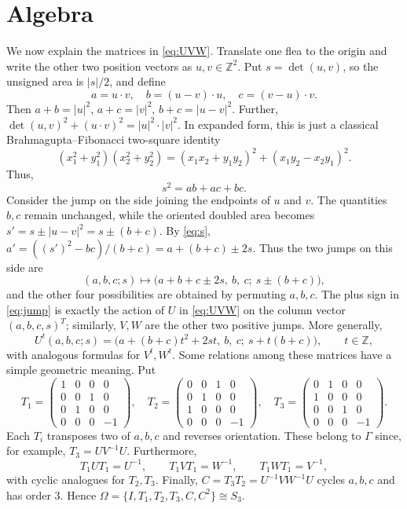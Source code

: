 \documentclass[12pt]{article}
\theoremstyle{definition}
\theoremstyle{remark}
\newcommand{\Z}{\mathbb Z}
\begin{document}
\section{Algebra}
We now explain the matrices in \eqref{eq:UVW}. Translate one flea to the
origin and write the other two position vectors as $u,v\in\Z^2$. Put
$s=\det(u,v)$, so the unsigned area is $|s|/2$, and define
\begin{equation*}
a=u\cdot v,\quad b=(u-v)\cdot u,\quad
c=(v-u)\cdot v.
\end{equation*}
Then $a+b=|u|^2$, $a+c=|v|^2$, $b+c=|u-v|^2$. Further, $\det(u,v)^2+(u\cdot v)^2=|u|^2\cdot |v|^2$. In expanded form, this is just a classical Brahmagupta–Fibonacci two-square identity 
\[
(x_1^2+y_1^2)(x_2^2+y_2^2)=(x_1x_2+y_1y_2)^2+(x_1y_2-x_2y_1)^2.
\]
Thus,
\begin{equation}\label{eq:s}
s^2=ab+ac+bc.
\end{equation}
Consider the jump on the side joining the endpoints of $u$ and $v$. The
quantities $b,c$ remain unchanged, while the oriented doubled area becomes
$s'=s\pm|u-v|^2=s\pm(b+c)$. By \eqref{eq:s},
$a'=((s')^2-bc)/(b+c)=a+(b+c)\pm2s$. Thus the two jumps on this side are
\begin{equation}\label{eq:jump}
(a,b,c;s)\longmapsto
\bigl(a+b+c\pm2s,\ b,\ c;\ s\pm(b+c)\bigr),
\end{equation}
and the other four possibilities are obtained by permuting $a,b,c$. The
plus sign in \eqref{eq:jump} is exactly the action of $U$ in
\eqref{eq:UVW} on the column vector $(a,b,c,s)^T$; similarly, $V,W$ are the
other two positive jumps. More generally,
\begin{equation}\label{power}
	U^t(a,b,c;s)=
	\bigl(a+(b+c)t^2+2st,\ b,\ c;\ s+t(b+c)\bigr),\qquad t\in\Z,
\end{equation}
with analogous formulas for $V^t,W^t$. Some relations among these matrices have a simple geometric meaning. Put
\[
T_1=\begin{pmatrix}
1&0&0&0\\0&0&1&0\\0&1&0&0\\0&0&0&-1
\end{pmatrix},\quad
T_2=\begin{pmatrix}
0&0&1&0\\0&1&0&0\\1&0&0&0\\0&0&0&-1
\end{pmatrix},\quad
T_3=\begin{pmatrix}
0&1&0&0\\1&0&0&0\\0&0&1&0\\0&0&0&-1
\end{pmatrix}.
\]
Each $T_i$ transposes two of $a,b,c$ and reverses orientation. These belong to $\Gamma$ since, for example, $T_{3}=UV^{-1}U$. Furthermore,
\begin{equation}\label{eq:T1-conjugation}
T_1UT_1=U^{-1},\qquad T_1VT_1=W^{-1},\qquad
T_1WT_1=V^{-1},
\end{equation}
with cyclic analogues for $T_2,T_3$. Finally,
$C=T_3T_2=U^{-1}VW^{-1}U$ cycles $a,b,c$ and has order $3$. Hence
$\Omega=\{I,T_1,T_2,T_3,C,C^2\}\cong S_3$.
\end{document}
